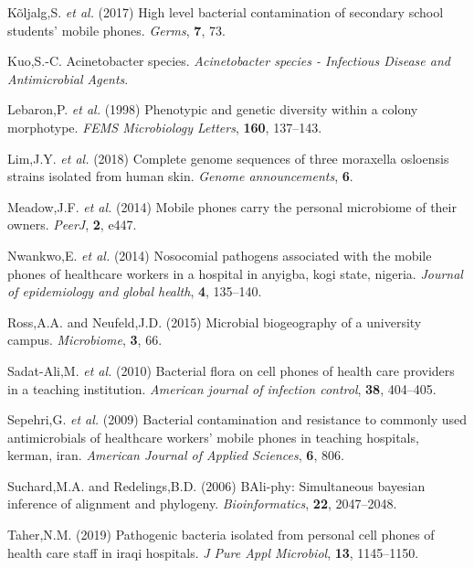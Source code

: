 \documentclass[]{article}
\begin{document}
\leavevmode\hypertarget{ref-koljalg2017high}{}%
Kõljalg,S. \emph{et al.} (2017) High level bacterial contamination of
secondary school students' mobile phones. \emph{Germs}, \textbf{7}, 73.

\leavevmode\hypertarget{ref-kuo}{}%
Kuo,S.-C. Acinetobacter species. \emph{Acinetobacter species -
Infectious Disease and Antimicrobial Agents}.

\leavevmode\hypertarget{ref-10.1111ux2fj.1574-6968.1998.tb12903.x}{}%
Lebaron,P. \emph{et al.} (1998) Phenotypic and genetic diversity within
a colony morphotype. \emph{FEMS Microbiology Letters}, \textbf{160},
137--143.

\leavevmode\hypertarget{ref-lim2018complete}{}%
Lim,J.Y. \emph{et al.} (2018) Complete genome sequences of three
moraxella osloensis strains isolated from human skin. \emph{Genome
announcements}, \textbf{6}.

\leavevmode\hypertarget{ref-meadow2014mobile}{}%
Meadow,J.F. \emph{et al.} (2014) Mobile phones carry the personal
microbiome of their owners. \emph{PeerJ}, \textbf{2}, e447.

\leavevmode\hypertarget{ref-nwankwo2014nosocomial}{}%
Nwankwo,E. \emph{et al.} (2014) Nosocomial pathogens associated with the
mobile phones of healthcare workers in a hospital in anyigba, kogi
state, nigeria. \emph{Journal of epidemiology and global health},
\textbf{4}, 135--140.

\leavevmode\hypertarget{ref-ross2015microbial}{}%
Ross,A.A. and Neufeld,J.D. (2015) Microbial biogeography of a university
campus. \emph{Microbiome}, \textbf{3}, 66.

\leavevmode\hypertarget{ref-sadat2010bacterial}{}%
Sadat-Ali,M. \emph{et al.} (2010) Bacterial flora on cell phones of
health care providers in a teaching institution. \emph{American journal
of infection control}, \textbf{38}, 404--405.

\leavevmode\hypertarget{ref-sepehri2009bacterial}{}%
Sepehri,G. \emph{et al.} (2009) Bacterial contamination and resistance
to commonly used antimicrobials of healthcare workers' mobile phones in
teaching hospitals, kerman, iran. \emph{American Journal of Applied
Sciences}, \textbf{6}, 806.

\leavevmode\hypertarget{ref-suchard2006bali}{}%
Suchard,M.A. and Redelings,B.D. (2006) BAli-phy: Simultaneous bayesian
inference of alignment and phylogeny. \emph{Bioinformatics},
\textbf{22}, 2047--2048.

\leavevmode\hypertarget{ref-taher2019pathogenic}{}%
Taher,N.M. (2019) Pathogenic bacteria isolated from personal cell phones
of health care staff in iraqi hospitals. \emph{J Pure Appl Microbiol},
\textbf{13}, 1145--1150.
\end{document}
